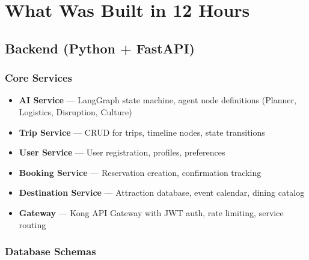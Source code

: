 \documentclass[11pt]{article}
\begin{document}
\section{What Was Built in 12 Hours}

\subsection{Backend (Python + FastAPI)}

\subsubsection{Core Services}

\begin{itemize}
    \item \textbf{AI Service} — LangGraph state machine, agent node definitions (Planner, Logistics, Disruption, Culture)
    \item \textbf{Trip Service} — CRUD for trips, timeline nodes, state transitions
    \item \textbf{User Service} — User registration, profiles, preferences
    \item \textbf{Booking Service} — Reservation creation, confirmation tracking
    \item \textbf{Destination Service} — Attraction database, event calendar, dining catalog
    \item \textbf{Gateway} — Kong API Gateway with JWT auth, rate limiting, service routing
\end{itemize}

\subsubsection{Database Schemas}
\end{document}

